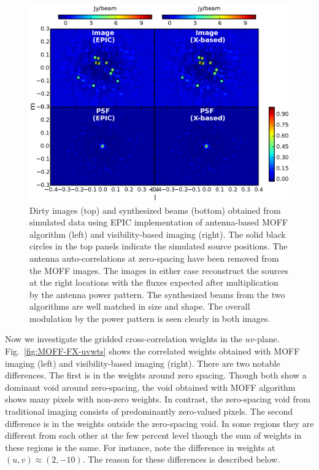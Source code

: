 \documentclass[a4paper,fleqn,usenatbib]{mnras}
\begin{document}
\begin{figure}
  \includegraphics[width=\columnwidth]{figure6}
  \caption{Dirty images (top) and synthesized beams (bottom) obtained from 
    simulated data using EPIC implementation of antenna-based MOFF algorithm 
    (left) and visibility-based imaging (right). The solid black circles in the
    top panels indicate the simulated source positions. The antenna 
    auto-correlations at zero-spacing have been removed from the MOFF images. 
    The images in either case reconstruct the sources at the right locations 
    with the fluxes expected after multiplication by the antenna power pattern. 
    The synthesized beams from the two algorithms are well matched in size and
    shape. The overall modulation by the power pattern is seen clearly in both
    images.}
  \label{fig:MOFF-FX-image}
\end{figure}

Now we investigate the gridded cross-correlation weights in the $uv$-plane. 
Fig.~\ref{fig:MOFF-FX-uvwts} shows the correlated weights obtained with MOFF 
imaging (left) and visibility-based imaging (right). There are two notable 
differences. The first is in the weights around zero spacing. Though both show a
dominant void around zero-spacing, the void obtained with MOFF algorithm shows 
many pixels with non-zero weights. In contrast, the zero-spacing void from 
traditional imaging consists of predominantly zero-valued pixels. The second 
difference is in the weights outside the zero-spacing void. In some regions they 
are different from each other at the few percent level though the sum of weights 
in these regions is the same. For instance, note the difference in weights at 
$(u,v)\approx (2,-10)$. The reason for these differences is described below.
\end{document}
